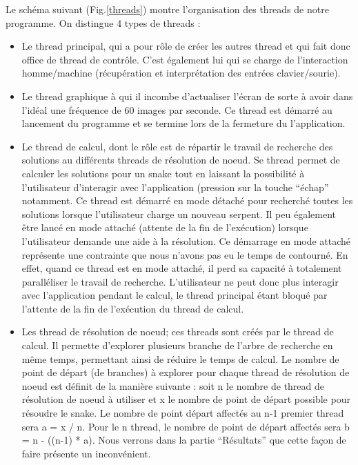Le schéma suivant (Fig.\ref{threads}) montre l'organisation des threads de notre programme. On distingue 4 types de threads :
\begin{itemize}
 \item Le thread principal, qui a pour rôle de créer les autres thread et qui fait donc office de thread de contrôle. C'est également lui qui se charge de l’interaction homme/machine (récupération et interprétation des entrées clavier/sourie).
 \item Le thread graphique à qui il incombe d'actualiser l'écran de sorte à avoir dans l'idéal une fréquence de 60 images par seconde. Ce thread est démarré au lancement du programme et se termine lors de la fermeture du l'application.
 \item Le thread de calcul, dont le rôle est de répartir le travail de recherche des solutions au différents threads de résolution de noeud. Se thread permet de calculer les solutions pour un snake tout en laissant la possibilité à l'utilisateur d'interagir avec l'application (pression sur la touche ``échap'' notamment. Ce thread est démarré en mode détaché pour recherché toutes les solutions lorsque l'utilisateur charge un nouveau serpent. Il peu également être lancé en mode attaché (attente de la fin de l’exécution) lorsque l'utilisateur demande une aide à la résolution. Ce démarrage en mode attaché représente une contrainte que nous n'avons pas eu le temps de contourné. En effet, quand ce thread est en mode attaché, il perd sa capacité à totalement paralléliser le travail de recherche. L'utilisateur ne peut donc plus interagir avec l'application pendant le calcul, le thread principal étant bloqué par l'attente de la fin de l'exécution du thread de calcul.
 \item Les thread de résolution de noeud; ces threads sont créés par le thread de calcul. Il permette d'explorer plusieurs branche de l'arbre de recherche en même temps, permettant ainsi de réduire le temps de calcul. Le nombre de point de départ (de branches) à explorer pour chaque thread de résolution de noeud est définit de la manière suivante : soit n le nombre de thread de résolution de noeud à utiliser et x le nombre de point de départ possible pour résoudre le snake. Le nombre de point départ affectés au n-1 premier thread sera a = x / n. Pour le n thread, le nombre de point de départ affectés sera b = n - ((n-1) * a). Nous verrons dans la partie ``Résultats'' que cette façon de faire présente un inconvénient.
\end{itemize}

